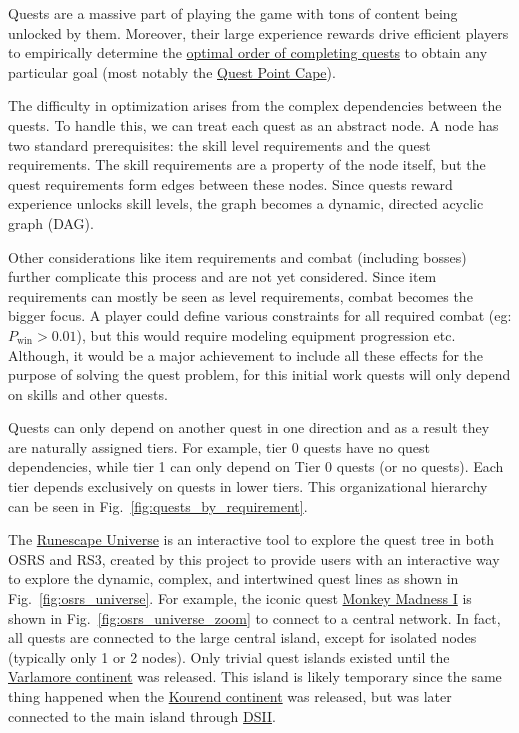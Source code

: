 Quests are a massive part of playing the game with tons of content being unlocked by them. Moreover, their large experience rewards drive efficient players to empirically determine the \href{https://oldschool.runescape.wiki/w/Optimal_quest_guide#Quests}{optimal order of completing quests} to obtain any particular goal (most notably the \href{https://oldschool.runescape.wiki/w/Quest_point_cape}{Quest Point Cape}).

The difficulty in optimization arises from the complex dependencies between the quests. To handle this, we can treat each quest as an abstract node. A node has two standard prerequisites: the skill level requirements and the quest requirements. The skill requirements are a property of the node itself, but the quest requirements form edges between these nodes. Since quests reward experience unlocks skill levels, the graph becomes a dynamic, directed acyclic graph (DAG).

Other considerations like item requirements and combat (including bosses) further complicate this process and are not yet considered. Since item requirements can mostly be seen as level requirements, combat becomes the bigger focus. A player could define various constraints for all required combat (eg: $P_\text{win}>0.01$), but this would require modeling equipment progression etc. Although, it would be a major achievement to include all these effects for the purpose of solving the quest problem, for this initial work quests will only depend on skills and other quests.

Quests can only depend on another quest in one direction and as a result they are naturally assigned tiers. For example, tier 0 quests have no quest dependencies, while tier 1 can only depend on Tier 0 quests (or no quests). Each tier depends exclusively on quests in lower tiers. This organizational hierarchy can be seen in Fig.~\ref{fig:quests_by_requirement}.

The \href{https://osrsmath.palfore.com/}{Runescape Universe} is an interactive tool to explore the quest tree in both OSRS and RS3, created by this project to provide users with an interactive way to explore the dynamic, complex, and intertwined quest lines as shown in Fig.~\ref{fig:osrs_universe}. For example, the iconic quest \href{https://oldschool.runescape.wiki/w/Monkey_Madness_I}{Monkey Madness I} is shown in Fig.~\ref{fig:osrs_universe_zoom} to connect to a central network. In fact, all quests are connected to the large central island, except for isolated nodes (typically only 1 or 2 nodes). Only trivial quest islands existed until the \href{https://oldschool.runescape.wiki/w/Varlamore}{Varlamore continent} was released. This island is likely temporary since the same thing happened when the \href{https://oldschool.runescape.wiki/w/Great_Kourend}{Kourend continent} was released, but was later connected to the main island through \href{https://oldschool.runescape.wiki/w/Dragon_Slayer_II}{DSII}.




